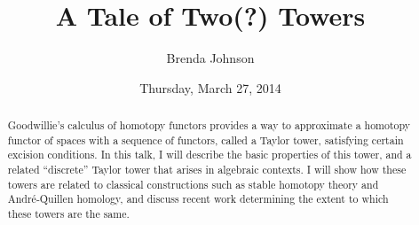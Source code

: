 \documentclass{UAmathtalk}
\author{Brenda Johnson}
\title{A Tale of Two(?) Towers}
\date{Thursday, March 27, 2014}
\begin{document}
\maketitle

\begin{abstract}
Goodwillie's calculus of homotopy functors provides a way to approximate a homotopy functor of spaces with a sequence of functors, called a Taylor tower, satisfying certain excision conditions.
In this talk, I will describe the basic properties of this tower, and a related ``discrete'' Taylor tower that arises in algebraic contexts.
I will show how these towers are related to classical constructions such as stable homotopy theory and Andr\'e-Quillen homology, and discuss recent work determining the extent to which these towers are the same.
\end{abstract}
\end{document}
